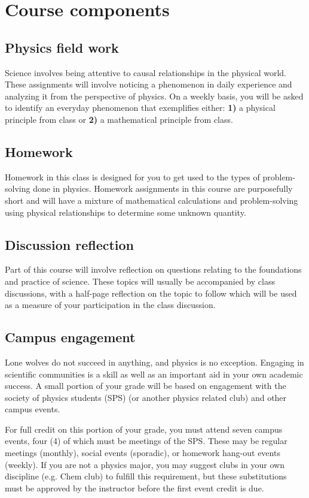 \documentclass{syllabus}
\begin{document}
\section*{Course components}
\subsection{Physics field work}
Science involves being attentive to causal relationships in the physical world. These assignments will involve noticing a phenomenon in daily experience and analyzing it from the perspective of physics. On a weekly basis, you will be asked to identify an everyday phenomenon that exemplifies either: \textbf{1)} a physical principle from class or \textbf{2)} a mathematical principle from class. 

\subsection{Homework}
Homework in this class is designed for you to get used to the types of problem-solving done in physics. Homework assignments in this course are purposefully short and will have a mixture of mathematical calculations and problem-solving using physical relationships to determine some unknown quantity. 

\subsection{Discussion reflection}
Part of this course will involve reflection on questions relating to the foundations and practice of science. These topics will usually be accompanied by class discussions, with a half-page reflection on the topic to follow which will be used as a measure of your participation in the class discussion. 

\subsection{Campus engagement}
Lone wolves do not succeed in anything, and physics is no exception. Engaging in scientific communities is a skill as well as an important aid in your own academic success. A small portion of your grade will be based on engagement with the society of physics students (SPS) (or another physics related club) and other campus events. 

For full credit on this portion of your grade, you must attend seven campus events, four (4) of which must be meetings of the SPS. These may be regular meetings (monthly), social events (sporadic), or homework hang-out events (weekly). If you are not a physics major, you may suggest clubs in your own discipline (e.g. Chem club) to fulfill this requirement, but these substitutions must be approved by the instructor before the first event credit is due. 
\end{document}
